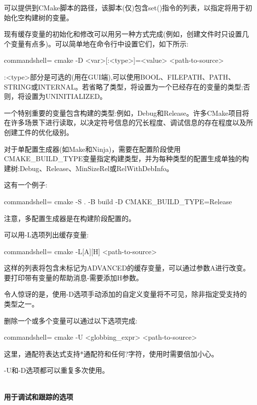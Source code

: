 可以提供到CMake脚本的路径，该脚本(仅)包含set()指令的列表，以指定将用于初始化空构建树的变量。

现有缓存变量的初始化和修改可以用另一种方式完成(例如，创建文件时只设置几个变量有点多)。可以简单地在命令行中设置它们，如下所示:

\begin{tcblisting}{commandshell={}}
cmake -D <var>[:<type>]=<value> <path-to-source>
\end{tcblisting}

:<type>部分是可选的(用在GUI端),可以使用BOOL、FILEPATH、PATH、STRING或INTERNAL。若省略了类型，将设置为一个已经存在的变量的类型;否则，将设置为UNINITIALIZED。

一个特别重要的变量包含构建的类型:例如，Debug和Release。许多CMake项目将在许多场景下进行读取，以决定符号信息的冗长程度、调试信息的存在程度以及所创建工件的优化级别。

对于单配置生成器(如Make和Ninja)，需要在配置阶段使用CMAKE\_BUILD\_TYPE变量指定构建类型，并为每种类型的配置生成单独的构建树:Debug、Release、MinSizeRel或RelWithDebInfo。

这有一个例子:

\begin{tcblisting}{commandshell={}}
cmake -S . -B build -D CMAKE_BUILD_TYPE=Release
\end{tcblisting}

注意，多配置生成器是在构建阶段配置的。

可以用-L选项列出缓存变量:

\begin{tcblisting}{commandshell={}}
cmake -L[A][H] <path-to-source>
\end{tcblisting}

这样的列表将包含未标记为ADVANCED的缓存变量，可以通过参数A进行改变。要打印带有变量的帮助消息-需要添加H参数。

令人惊讶的是，使用-D选项手动添加的自定义变量将不可见，除非指定受支持的类型之一。

删除一个或多个变量可以通过以下选项完成:

\begin{tcblisting}{commandshell={}}
cmake -U <globbing_expr> <path-to-source>
\end{tcblisting}

这里，通配符表达式支持*通配符和任何?字符，使用时需要倍加小心。

-U和-D选项都可以重复多次使用。

\hspace*{\fill} \\ %
\noindent
\textbf{用于调试和跟踪的选项}

